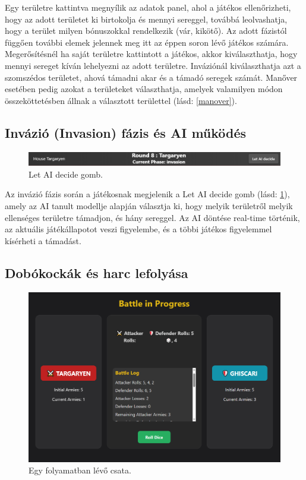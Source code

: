 \documentclass[
]{thesis-ekf}
\theoremstyle{definition}
\theoremstyle{remark}
\begin{document}
	Egy területre kattintva megnyílik az adatok panel, ahol a játékos ellenőrizheti, hogy az adott területet ki birtokolja és mennyi sereggel, továbbá leolvashatja, hogy a terület milyen bónuszokkal rendelkezik (vár, kikötő). Az adott fázistól függően további elemek jelennek meg itt az éppen soron lévő játékos számára. Megerősítésnél ha saját területre kattintott a játékos, akkor kiválaszthatja, hogy mennyi sereget kíván lehelyezni az adott területre. Inváziónál kiválaszthatja azt a szomszédos területet, ahová támadni akar és a támadó seregek számát. Manőver esetében pedig azokat a területeket választhatja, amelyek valamilyen módon összeköttetésben állnak a választott területtel (lásd: \ref{manover}).
	
	\subsection*{Invázió (Invasion) fázis és AI működés}
	
	\begin{figure}[ht!]
		\centering
		\includegraphics[width=16cm]{AIDont.png}
		\caption{Let AI decide gomb.}
		\label{AIDont}
	\end{figure}
	
	Az invázió fázis során a játékosnak megjelenik a Let AI decide gomb (lásd: \ref{AIDont}), amely az AI tanult modellje alapján választja ki, hogy melyik területről melyik ellenséges területre támadjon, és hány sereggel. Az AI döntése real-time történik, az aktuális játékállapotot veszi figyelembe, és a többi játékos figyelemmel kísérheti a támadást.
	
	\subsection*{Dobókockák és harc lefolyása}
	
	\begin{figure}[ht!]
		\centering
		\includegraphics[width=16cm]{battle.png}
		\caption{Egy folyamatban lévő csata.}
		\label{battle}
	\end{figure}
	
\end{document}
